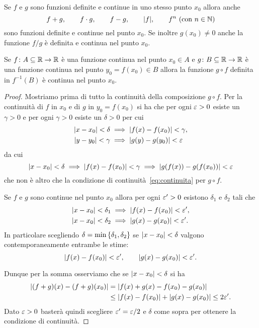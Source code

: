 \begin{theorem}
\label{th:continuita_composizione}%
Se $f$ e $g$ sono funzioni definite e continue
in uno stesso punto $x_0$
allora anche
\[
  f+g, \qquad
  f\cdot g, \qquad
  f-g, \qquad
  {\left|f\right|}, \qquad
  f^n\ \text{(con $n\in \mathbb N$)}
\]
sono funzioni definite e continue nel punto $x_0$.
Se inoltre $g(x_0)\neq 0$ anche la funzione
$f/g$
è definita e continua nel punto $x_0$.

Se $f\colon A\subseteq \mathbb R \to \mathbb R$ è una funzione continua
nel punto $x_0\in A$ e
$g\colon B\subseteq \mathbb R \to \mathbb R$ è una funzione
continua nel punto $y_0=f(x_0)\in B$ allora la funzione $g\circ f$
definita in $f^{-1}(B)$ è continua nel punto $x_0$.
\end{theorem}
%
\begin{proof}
Mostriamo prima di tutto la continuità
della composizione $g\circ f$.
Per la continuità di $f$ in $x_0$ e di $g$ in $y_0=f(x_0)$
si ha che per ogni $\varepsilon>0$ esiste un $\gamma>0$
e per ogni $\gamma>0$ esiste un $\delta>0$ per cui
\begin{align*}
 {\left|x-x_0\right|}< \delta &\implies {\left|f(x)-f(x_0)\right|}<\gamma,\\
 {\left|y-y_0\right|}< \gamma & \implies {\left|g(y)-g(y_0)\right|}<\varepsilon
\end{align*}
da cui
\[
{\left|x-x_0\right|}< \delta
\implies {\left|f(x)-f(x_0)\right|}< \gamma
\implies {\left|g(f(x))-g(f(x_0))\right|} < \varepsilon
\]
che non è altro che la condizione di
continuità~\eqref{eq:continuita} per $g\circ f$.

Se $f$ e $g$ sono continue nel punto $x_0$
allora per ogni $\varepsilon'>0$ esistono $\delta_1$
e $\delta_2$ tali che
\begin{align*}
 {\left|x-x_0\right|} < \delta_1 &\implies {\left|f(x)-f(x_0)\right|} < \varepsilon',
 \\
 {\left|x-x_0\right|} < \delta_2 &\implies {\left|g(x)-g(x_0)\right|} < \varepsilon'.
\end{align*}
In particolare scegliendo $\delta = \min{\left\{ \delta_1,\delta_2 \right\}}$
se ${\left|x-x_0\right|} < \delta$ valgono contemporaneamente
entrambe le stime:
\[
 {\left|f(x)-f(x_0)\right|}< \varepsilon', \qquad
 {\left|g(x)-g(x_0)\right|}< \varepsilon'.
\]

Dunque per la somma osserviamo che se ${\left|x-x_0\right|}<\delta$
si ha
\begin{align*}
 {\left|(f+g)(x) - (f+g)(x_0)\right|}
  &= {\left|f(x)+g(x)-f(x_0)-g(x_0)\right|}\\
  &\le {\left|f(x)-f(x_0)\right|} + {\left|g(x)-g(x_0)\right|}
  \le 2 \varepsilon'.
\end{align*}
Dato $\varepsilon>0$ basterà quindi scegliere $\varepsilon' = \varepsilon / 2$
e $\delta$ come sopra per ottenere la condizione di continuità.


\end{proof}
